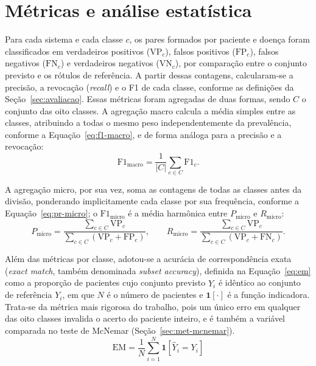 \section{Métricas e análise estatística}\label{sec:met-metricas}

Para cada sistema e cada classe $c$, os pares formados por paciente e doença foram classificados em verdadeiros positivos ($\mathrm{VP}_c$), falsos positivos ($\mathrm{FP}_c$), falsos negativos ($\mathrm{FN}_c$) e verdadeiros negativos ($\mathrm{VN}_c$), por comparação entre o conjunto previsto e os rótulos de referência. A partir dessas contagens, calcularam-se a precisão, a revocação (\textit{recall}) e o F1 de cada classe, conforme as definições da Seção~\ref{sec:avaliacao}. Essas métricas foram agregadas de duas formas, sendo $C$ o conjunto das oito classes. A agregação macro calcula a média simples entre as classes, atribuindo a todas o mesmo peso independentemente da prevalência, conforme a Equação~\eqref{eq:f1-macro}, e de forma análoga para a precisão e a revocação:
\begin{equation}
\mathrm{F1}_{\text{macro}} = \frac{1}{|C|}\sum_{c \in C} \mathrm{F1}_c .
\label{eq:f1-macro}
\end{equation}

A agregação micro, por sua vez, soma as contagens de todas as classes antes da divisão, ponderando implicitamente cada classe por sua frequência, conforme a Equação~\eqref{eq:pr-micro}; o $\mathrm{F1}_{\text{micro}}$ é a média harmônica entre $P_{\text{micro}}$ e $R_{\text{micro}}$:
\begin{equation}
P_{\text{micro}} = \frac{\sum_{c \in C} \mathrm{VP}_c}{\sum_{c \in C} \left(\mathrm{VP}_c + \mathrm{FP}_c\right)},
\qquad
R_{\text{micro}} = \frac{\sum_{c \in C} \mathrm{VP}_c}{\sum_{c \in C} \left(\mathrm{VP}_c + \mathrm{FN}_c\right)} .
\label{eq:pr-micro}
\end{equation}

Além das métricas por classe, adotou-se a acurácia de correspondência exata (\textit{exact match}, também denominada \textit{subset accuracy}), definida na Equação~\eqref{eq:em} como a proporção de pacientes cujo conjunto previsto $\hat{Y}_i$ é idêntico ao conjunto de referência $Y_i$, em que $N$ é o número de pacientes e $\mathbf{1}[\cdot]$ é a função indicadora. Trata-se da métrica mais rigorosa do trabalho, pois um único erro em qualquer das oito classes invalida o acerto do paciente inteiro, e é também a variável comparada no teste de McNemar (Seção~\ref{sec:met-mcnemar}).
\begin{equation}
\mathrm{EM} = \frac{1}{N}\sum_{i=1}^{N} \mathbf{1}\left[\hat{Y}_i = Y_i\right]
\label{eq:em}
\end{equation}

